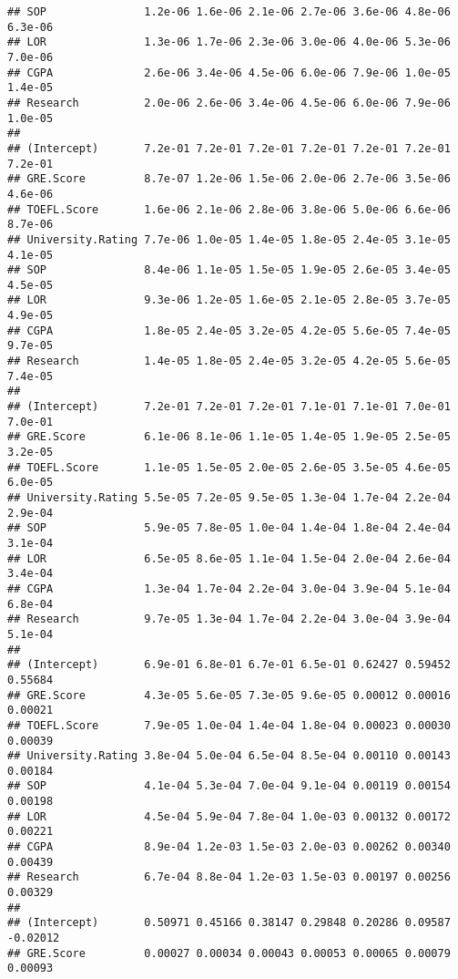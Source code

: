 \documentclass[
]{article}
\begin{document}
\begin{verbatim}
## SOP               1.2e-06 1.6e-06 2.1e-06 2.7e-06 3.6e-06 4.8e-06 6.3e-06
## LOR               1.3e-06 1.7e-06 2.3e-06 3.0e-06 4.0e-06 5.3e-06 7.0e-06
## CGPA              2.6e-06 3.4e-06 4.5e-06 6.0e-06 7.9e-06 1.0e-05 1.4e-05
## Research          2.0e-06 2.6e-06 3.4e-06 4.5e-06 6.0e-06 7.9e-06 1.0e-05
##                                                                          
## (Intercept)       7.2e-01 7.2e-01 7.2e-01 7.2e-01 7.2e-01 7.2e-01 7.2e-01
## GRE.Score         8.7e-07 1.2e-06 1.5e-06 2.0e-06 2.7e-06 3.5e-06 4.6e-06
## TOEFL.Score       1.6e-06 2.1e-06 2.8e-06 3.8e-06 5.0e-06 6.6e-06 8.7e-06
## University.Rating 7.7e-06 1.0e-05 1.4e-05 1.8e-05 2.4e-05 3.1e-05 4.1e-05
## SOP               8.4e-06 1.1e-05 1.5e-05 1.9e-05 2.6e-05 3.4e-05 4.5e-05
## LOR               9.3e-06 1.2e-05 1.6e-05 2.1e-05 2.8e-05 3.7e-05 4.9e-05
## CGPA              1.8e-05 2.4e-05 3.2e-05 4.2e-05 5.6e-05 7.4e-05 9.7e-05
## Research          1.4e-05 1.8e-05 2.4e-05 3.2e-05 4.2e-05 5.6e-05 7.4e-05
##                                                                          
## (Intercept)       7.2e-01 7.2e-01 7.2e-01 7.1e-01 7.1e-01 7.0e-01 7.0e-01
## GRE.Score         6.1e-06 8.1e-06 1.1e-05 1.4e-05 1.9e-05 2.5e-05 3.2e-05
## TOEFL.Score       1.1e-05 1.5e-05 2.0e-05 2.6e-05 3.5e-05 4.6e-05 6.0e-05
## University.Rating 5.5e-05 7.2e-05 9.5e-05 1.3e-04 1.7e-04 2.2e-04 2.9e-04
## SOP               5.9e-05 7.8e-05 1.0e-04 1.4e-04 1.8e-04 2.4e-04 3.1e-04
## LOR               6.5e-05 8.6e-05 1.1e-04 1.5e-04 2.0e-04 2.6e-04 3.4e-04
## CGPA              1.3e-04 1.7e-04 2.2e-04 3.0e-04 3.9e-04 5.1e-04 6.8e-04
## Research          9.7e-05 1.3e-04 1.7e-04 2.2e-04 3.0e-04 3.9e-04 5.1e-04
##                                                                          
## (Intercept)       6.9e-01 6.8e-01 6.7e-01 6.5e-01 0.62427 0.59452 0.55684
## GRE.Score         4.3e-05 5.6e-05 7.3e-05 9.6e-05 0.00012 0.00016 0.00021
## TOEFL.Score       7.9e-05 1.0e-04 1.4e-04 1.8e-04 0.00023 0.00030 0.00039
## University.Rating 3.8e-04 5.0e-04 6.5e-04 8.5e-04 0.00110 0.00143 0.00184
## SOP               4.1e-04 5.3e-04 7.0e-04 9.1e-04 0.00119 0.00154 0.00198
## LOR               4.5e-04 5.9e-04 7.8e-04 1.0e-03 0.00132 0.00172 0.00221
## CGPA              8.9e-04 1.2e-03 1.5e-03 2.0e-03 0.00262 0.00340 0.00439
## Research          6.7e-04 8.8e-04 1.2e-03 1.5e-03 0.00197 0.00256 0.00329
##                                                                           
## (Intercept)       0.50971 0.45166 0.38147 0.29848 0.20286 0.09587 -0.02012
## GRE.Score         0.00027 0.00034 0.00043 0.00053 0.00065 0.00079  0.00093

\end{verbatim}
\end{document}
